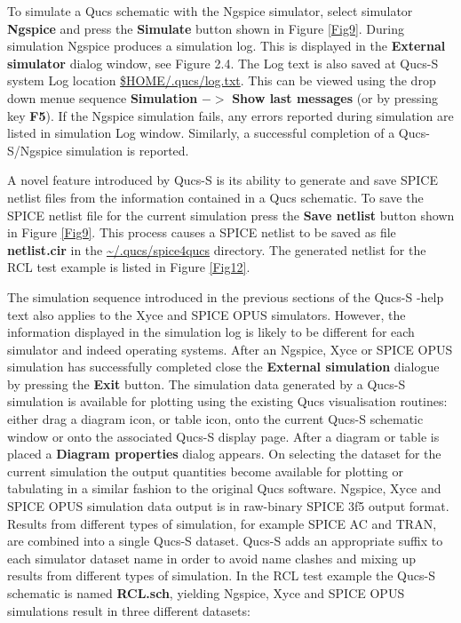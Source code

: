 \documentclass[10pt, a4paper]{report}
\begin{document}
To simulate a Qucs schematic with the Ngspice simulator, select simulator\textbf{ Ngspice} and press the \textbf{Simulate} button shown in Figure \ref{Fig9}.  During simulation Ngspice produces a simulation log. This is displayed in the\textbf{ External simulator} dialog window, see Figure 2.4. The Log text is also saved at Qucs-S system Log location \url{$HOME/.qucs/log.txt}. This can be viewed using the drop down menue sequence \textbf{Simulation} $->$ \textbf{Show last messages} (or by pressing key \textbf{F5}). If the Ngspice simulation fails, any errors reported during simulation are listed in simulation Log window. Similarly, a successful completion of a Qucs-S/Ngspice simulation is reported.
\newline

\noindent A novel feature introduced by Qucs-S is its ability to generate and save SPICE netlist files from the information contained in a Qucs schematic. To save the SPICE netlist file for the current simulation press the \textbf{Save netlist} button shown in Figure \ref{Fig9}. This process causes a SPICE netlist to be saved as file \textbf{netlist.cir} in the \url{~/.qucs/spice4qucs} directory. The generated netlist for the RCL test example is listed in Figure \ref{Fig12}.


\noindent The simulation sequence introduced in the previous sections of the Qucs-S -help text also applies to the Xyce and SPICE OPUS simulators. However, the information displayed in the simulation log is likely to be different for each simulator and indeed operating systems. After an Ngspice, Xyce or SPICE OPUS simulation has successfully completed close the \textbf{External simulation} dialogue by pressing the \textbf{Exit} button. The simulation data generated by a Qucs-S simulation is available for plotting using the existing Qucs visualisation routines: either drag a diagram icon, or table icon, onto the current Qucs-S schematic window or onto the associated Qucs-S display page. After a diagram or table is placed a \textbf{Diagram properties} dialog appears. On selecting the dataset for the current simulation the output quantities become available for plotting or tabulating in a similar fashion to the original Qucs software. Ngspice, Xyce and SPICE OPUS simulation data output is in raw-binary SPICE 3f5 output format. Results from different types of simulation, for example SPICE AC and TRAN, are combined into a single Qucs-S dataset.  Qucs-S adds an appropriate suffix to each simulator dataset name in order to avoid name clashes and mixing up results from different types of simulation. In the RCL test example the Qucs-S schematic is named \textbf{RCL.sch}, yielding Ngspice, Xyce and SPICE OPUS simulations result in three different datasets:
\end{document}
